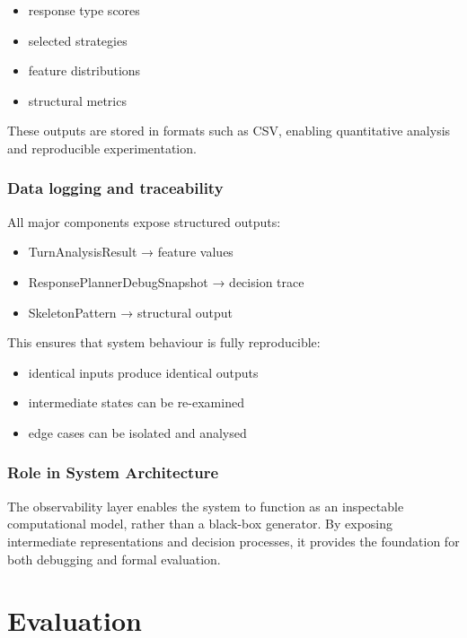 \begin{itemize}
\item
  response type scores
\item
  selected strategies
\item
  feature distributions
\item
  structural metrics
\end{itemize}

These outputs are stored in formats such as CSV, enabling quantitative
analysis and reproducible experimentation.

\subsubsection{Data logging and
traceability}\label{data-logging-and-traceability}

All major components expose structured outputs:

\begin{itemize}
\item
  TurnAnalysisResult → feature values
\item
  ResponsePlannerDebugSnapshot → decision trace
\item
  SkeletonPattern → structural output
\end{itemize}

This ensures that system behaviour is fully reproducible:

\begin{itemize}
\item
  identical inputs produce identical outputs
\item
  intermediate states can be re-examined
\item
  edge cases can be isolated and analysed
\end{itemize}

\subsubsection{Role in System
Architecture}\label{role-in-system-architecture-5}

The observability layer enables the system to function as an inspectable
computational model, rather than a black-box generator. By exposing
intermediate representations and decision processes, it provides the
foundation for both debugging and formal evaluation.

\section{Evaluation}\label{evaluation}

